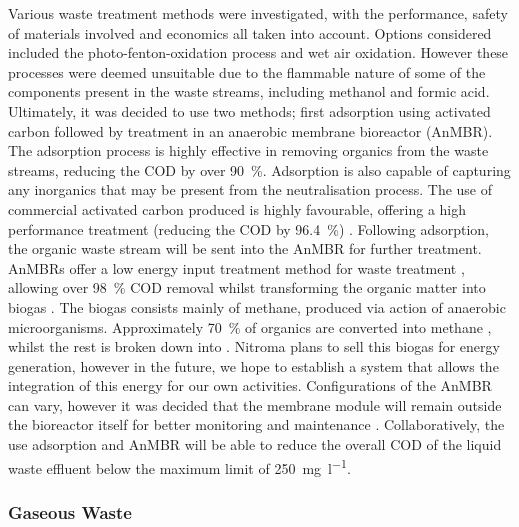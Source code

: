 Various waste treatment methods were investigated, with the performance,  safety of materials involved and economics all taken into account. Options considered included the photo-fenton-oxidation process and wet air oxidation. However these processes were deemed unsuitable due to the flammable nature of some of the components present in the waste streams, including methanol and formic acid. Ultimately, it was decided to use two methods; first adsorption using activated carbon followed by treatment in an anaerobic membrane bioreactor (AnMBR). The adsorption process is highly effective in removing organics from the waste streams, reducing the COD by over \SI{90}{\percent}. Adsorption is also capable of capturing any inorganics that may be present from the neutralisation process. The use of commercial activated carbon produced is highly favourable,  offering a high performance treatment (reducing the COD by \SI{96.4}{\percent}) \cite{aluyor_cod_2008}. Following adsorption, the organic waste stream will be sent into the AnMBR for further treatment. AnMBRs offer a low energy input treatment method for waste treatment \cite{maaz_anaerobic_2019}, allowing over \SI{98}{\percent} COD removal whilst transforming the organic matter into biogas \cite{chen_brewery_2016}. The biogas consists mainly of methane, produced via action of anaerobic microorganisms. Approximately \SI{70}{\percent} of organics are converted into methane \cite{ariunbaatar_performance_2021}, whilst the rest is broken down into . Nitroma plans to sell this biogas for energy generation, however in the future, we hope to establish a system that allows the integration of this energy for our own activities. Configurations of the AnMBR can vary, however it was decided that the membrane module will remain outside the bioreactor itself for better monitoring and maintenance \cite{maaz_anaerobic_2019}. Collaboratively, the use adsorption and AnMBR will be able to reduce the overall COD of the liquid waste effluent below the maximum limit of \SI{250}{\mg\per\litre}. 

\subsubsection{Gaseous Waste}

